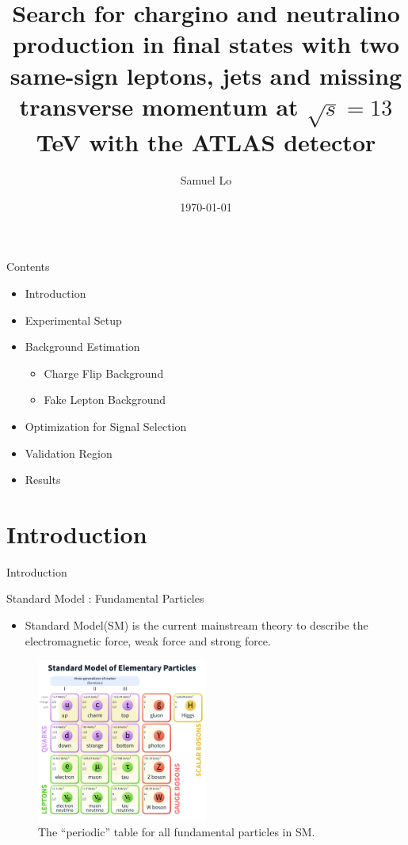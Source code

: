 \documentclass[mathserif,serif]{beamer}
\title[Lo Cheuk Yee]{Search for chargino and neutralino production in final states with two same-sign leptons, jets and missing transverse momentum at $\sqrt{s} = 13$ TeV with the ATLAS detector}
\author[]
{
Samuel Lo
}
\institute[]
{
The University of Hong Kong
}
\date[]{\today}
\begin{document}
\frame{\titlepage}

\begin{frame}{Contents}
\begin{itemize}
\item Introduction
\item Experimental Setup
\item Background Estimation
\begin{itemize}
\item Charge Flip Background
\item Fake Lepton Background
\end{itemize}
\item Optimization for Signal Selection
\item Validation Region
\item Results
\end{itemize}
\end{frame}

\section{Introduction}
\begin{frame}
\begin{center}
\huge
Introduction
\end{center}
\end{frame}

\begin{frame}{Standard Model : Fundamental Particles}
\begin{itemize}
\item Standard Model(SM) is the current mainstream theory to describe the electromagnetic force, weak force and strong force.
\end{itemize}

\begin{figure}
\centering
\includegraphics[width=0.5\textwidth]{data/photo/theory/SM_particles.png}
\caption{The ``periodic'' table for all fundamental particles in SM.}
\end{figure}
\end{frame}
\end{document}
